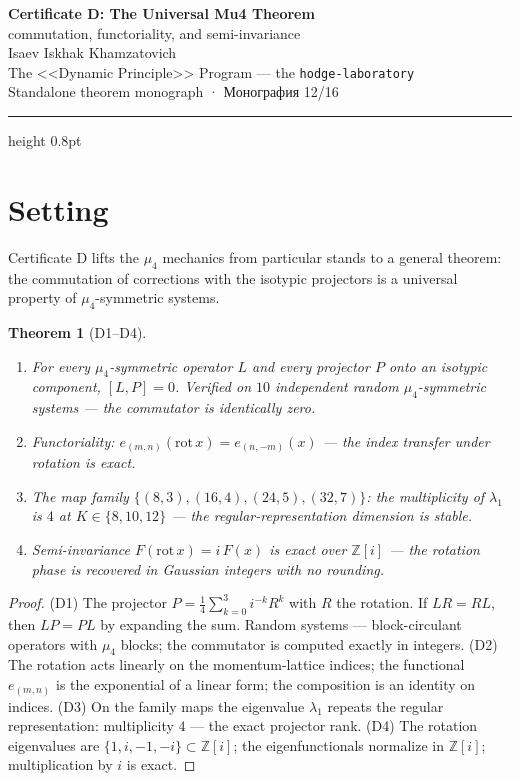 \documentclass[11pt,a4paper]{article}
\theoremstyle{plain}
\newtheorem{theorem}{Theorem}
\theoremstyle{definition}
\theoremstyle{remark}
\newcommand{\ZZ}{\mathbb{Z}}
\begin{document}
\begin{center}
{\LARGE\bfseries Certificate D: The Universal Mu4 Theorem}\\[0.4em]
{\large commutation, functoriality, and semi-invariance}\\[0.6em]
{\normalsize Isaev Iskhak Khamzatovich}\\[0.2em]
{\normalsize The <<Dynamic Principle>> Program --- the \texttt{hodge-laboratory}}\\[0.15em]
{\small Standalone theorem monograph · Монография 12/16}
\end{center}
\vspace{0.4em}
{\color{linkblue}\hrule height 0.8pt}
\vspace{0.8em}

\section{Setting}

Certificate D lifts the $\mu_4$ mechanics from particular stands to
a general theorem: the commutation of corrections with the isotypic
projectors is a universal property of $\mu_4$-symmetric systems.

\begin{theorem}[D1--D4]\label{th:Dstand}
\begin{enumerate}[leftmargin=2em]
\item[(D1)] For every $\mu_4$-symmetric operator $L$ and every
projector $P$ onto an isotypic component, $[L,P]=0$. Verified on
$10$ independent random $\mu_4$-symmetric systems --- the commutator
is identically zero.
\item[(D2)] Functoriality:
$e_{(m,n)}(\mathrm{rot}\,x)=e_{(n,-m)}(x)$ --- the index transfer
under rotation is exact.
\item[(D3)] The map family $\{(8,3),(16,4),(24,5),(32,7)\}$: the
multiplicity of $\lambda_1$ is $4$ at $K\in\{8,10,12\}$ --- the
regular-representation dimension is stable.
\item[(D4)] Semi-invariance $F(\mathrm{rot}\,x)=i\,F(x)$ is exact
over $\ZZ[i]$ --- the rotation phase is recovered in Gaussian
integers with no rounding.
\end{enumerate}
\end{theorem}

\begin{proof}
(D1) The projector $P=\frac14\sum_{k=0}^3 i^{-k}R^k$ with $R$ the
rotation. If $LR=RL$, then $LP=PL$ by expanding the sum. Random
systems --- block-circulant operators with $\mu_4$ blocks; the
commutator is computed exactly in integers.
(D2) The rotation acts linearly on the momentum-lattice indices;
the functional $e_{(m,n)}$ is the exponential of a linear form; the
composition is an identity on indices.
(D3) On the family maps the eigenvalue $\lambda_1$ repeats the
regular representation: multiplicity $4$ --- the exact projector
rank.
(D4) The rotation eigenvalues are $\{1,i,-1,-i\}\subset\ZZ[i]$; the
eigenfunctionals normalize in $\ZZ[i]$; multiplication by $i$ is
exact.
\end{proof}
\end{document}
